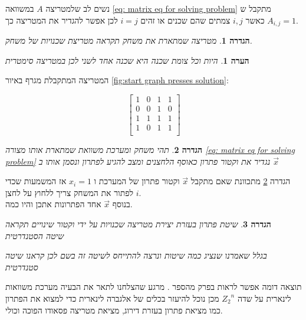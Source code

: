 \documentclass[12pt,twoside]{article}
\newtheorem{definition}{הגדרה}[section]
\newtheorem{comm}{הערה}[section]
\newcommand{\Zn}{{Z_2}^n}
\begin{document}
נשים לב שלמטריצה
$A$
במשוואה
\ref{eq: matrix eq for solving problem}
מתקבל ש
$A_{i,j} = 1$
כאשר 
$i, j$
צמתים שהם שכנים או זהים
$i = j$
לכן אפשר להגדיר את המטריצה כך.

\begin{definition}
    \label{def: neighbor matrix}
    מטריצה שמתארת את משחק תקראה מטריצת שכנויות של משחק.
\end{definition}


\begin{comm}
    \label{comm: symetic matrix}
    היות וכל צומת שכנה היא שכנה אחד לשני לכן במטריצה
    סימטרית
\end{comm}

המטריצה  המתקבלת מגרף באיור 
\ref{fig:start graph presses solution}:

\[
    \begin{bmatrix}
        1 & 0 & 1 & 1\\
        0 & 0 & 1 & 0\\
        1 & 1 & 1 & 1\\
        1 & 0 & 1 & 1\\
    \end{bmatrix}
\]


\begin{definition}
    \label{ def: solution vector}
    תהי משחק ומערכת משוואת שמתארת אותו מצורה 
    \ref{eq: matrix eq for solving problem} 
    נגדיר את וקטור פתרון כאוסף הלחצנים ומצב להגיע לפתרון
    ונסמן אותו ב
    $\vec{x}$
\end{definition}

הגדרה 
\ref{ def: solution vector}
מתכוונת שאם מתקבל
$\vec{x}$
וקטור פתרון של המערכת 
ו
$x_i = 1$
אז המשמעות שכדי לפתור את המשחק
צריך ללחוץ על לחצן 
$i$.
\\
בנוסף 
$\vec{x}$
אחד הפתרונות אתכן והיו כמה.

\begin{definition}
    \label{def: standard solution}
    שיטת פתרון בעזרת יצירת  מטריצה שכנויות על ידי וקטור שינויים תקראה
    \\
    שיטה הסטנדרטית

    בגלל שאמרנו שנציג כמה שיטות ונרצה להתייחס לשיטה זה בשם לכן קראנו שיטה סטנדרטית
\end{definition}

תוצאה דומה אפשר לראות בפרק מהספר
\cite{B2}.
מרגע שהצלחנו לתאר את הבעיה מערכת משוואות לינארית
על שדה
$\Zn$
מכן נוכל להיעזר בכלים של אלגברה לינארית כדי למצוא את הפתרון כמו מציאת פתרון בעזרת דירוג,
מציאת מטריצה פסאודו הפוכה וכולי. 
\end{document}
